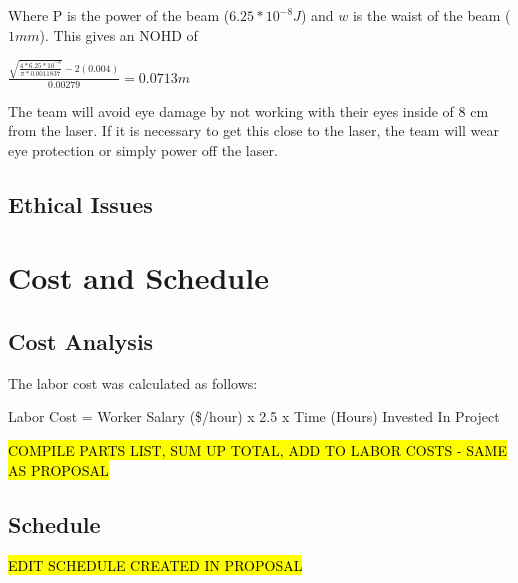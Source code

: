 \documentclass[letterpaper,10pt]{article}
\begin{document}
\begin{spacing}{1.15}
Where P is the power of the beam ($6.25*10^{-8} J$) and $w$ is the waist of the beam ($1mm$). This gives an NOHD of 

{\Large$ \frac{\sqrt{\frac{4 * 6.25*10^{-8}}{\pi * 0.0011837}} - 2(0.004)}{0.00279} = 0.0713 m $}

The team will avoid eye damage by not working with their eyes inside of 8 cm from the laser. If it is necessary to get this close to the laser, the team will wear eye protection or simply power off the laser. 


\subsection{Ethical Issues}


\clearpage
\section{Cost and Schedule}

\subsection{Cost Analysis}
The labor cost was calculated as follows:

\begin{center}
	Labor Cost = Worker Salary (\$/hour) x 2.5 x Time (Hours) Invested In Project
\end{center}

\hl{COMPILE PARTS LIST, SUM UP TOTAL, ADD TO LABOR COSTS - SAME AS PROPOSAL}

\subsection{Schedule}
\hl{EDIT SCHEDULE CREATED IN PROPOSAL}


\clearpage


\clearpage
\end{spacing}
\end{document}
